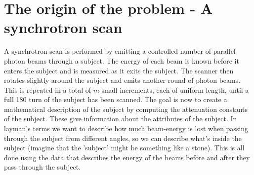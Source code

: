 \section{The origin of the problem - A synchrotron scan}
A synchrotron scan is performed by emitting a controlled number of parallel photon beams through a subject. The energy of each beam is known before it enters the subject and is measured as it exits the subject. 
The scanner then rotates slightly around the subject and emits another round of photon beams. This is repeated in a total of $m$ small increments, each of uniform length, until a full 180 turn of the subject has been scanned. 
The goal is now to create a mathematical description of the subject by computing the attenuation constants of the subject. These give information about the attributes of the subject. In layman's terms we want to describe how much beam-energy is lost when passing through the subject from different angles,
so we can describe what's inside the subject (imagine that the 'subject' might be something like a stone). This is all done using the data that describes the energy of the beams before and after they pass through the subject.